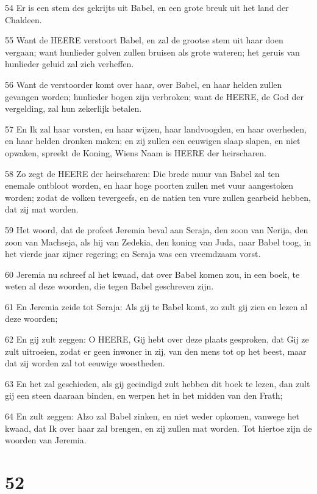 \par 54 Er is een stem des gekrijts uit Babel, en een grote breuk uit het land der Chaldeen.
\par 55 Want de HEERE verstoort Babel, en zal de grootse stem uit haar doen vergaan; want hunlieder golven zullen bruisen als grote wateren; het geruis van hunlieder geluid zal zich verheffen.
\par 56 Want de verstoorder komt over haar, over Babel, en haar helden zullen gevangen worden; hunlieder bogen zijn verbroken; want de HEERE, de God der vergelding, zal hun zekerlijk betalen.
\par 57 En Ik zal haar vorsten, en haar wijzen, haar landvoogden, en haar overheden, en haar helden dronken maken; en zij zullen een eeuwigen slaap slapen, en niet opwaken, spreekt de Koning, Wiens Naam is HEERE der heirscharen.
\par 58 Zo zegt de HEERE der heirscharen: Die brede muur van Babel zal ten enemale ontbloot worden, en haar hoge poorten zullen met vuur aangestoken worden; zodat de volken tevergeefs, en de natien ten vure zullen gearbeid hebben, dat zij mat worden.
\par 59 Het woord, dat de profeet Jeremia beval aan Seraja, den zoon van Nerija, den zoon van Machseja, als hij van Zedekia, den koning van Juda, naar Babel toog, in het vierde jaar zijner regering; en Seraja was een vreemdzaam vorst.
\par 60 Jeremia nu schreef al het kwaad, dat over Babel komen zou, in een boek, te weten al deze woorden, die tegen Babel geschreven zijn.
\par 61 En Jeremia zeide tot Seraja: Als gij te Babel komt, zo zult gij zien en lezen al deze woorden;
\par 62 En gij zult zeggen: O HEERE, Gij hebt over deze plaats gesproken, dat Gij ze zult uitroeien, zodat er geen inwoner in zij, van den mens tot op het beest, maar dat zij worden zal tot eeuwige woestheden.
\par 63 En het zal geschieden, als gij geeindigd zult hebben dit boek te lezen, dan zult gij een steen daaraan binden, en werpen het in het midden van den Frath;
\par 64 En zult zeggen: Alzo zal Babel zinken, en niet weder opkomen, vanwege het kwaad, dat Ik over haar zal brengen, en zij zullen mat worden. Tot hiertoe zijn de woorden van Jeremia.

\chapter{52}

